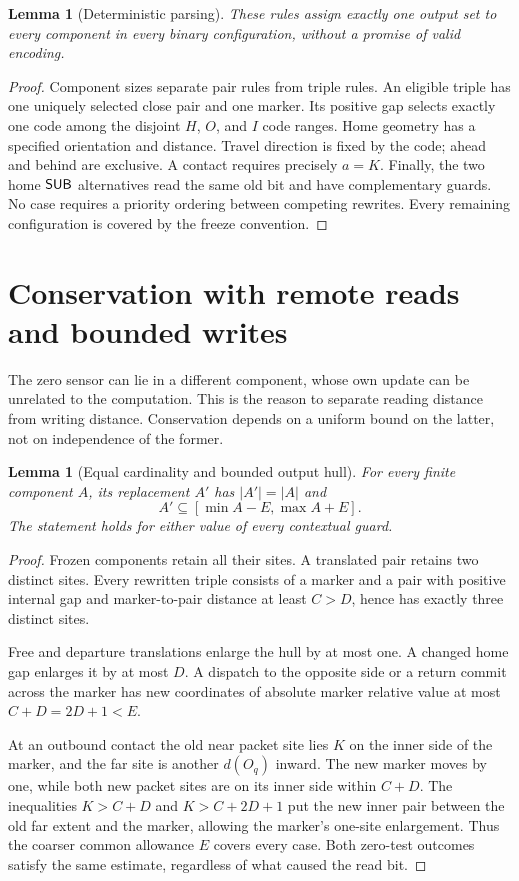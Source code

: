 \documentclass[11pt,a4paper]{article}
\numberwithin{equation}{section}
\newtheorem{lemma}[theorem]{Lemma}
\begin{document}
\begin{lemma}[Deterministic parsing]\label{fpa:bc:lem:parse}
These rules assign exactly one output set to every component in every binary
configuration, without a promise of valid encoding.
\end{lemma}
\begin{proof}
Component sizes separate pair rules from triple rules. An eligible triple has
one uniquely selected close pair and one marker. Its positive gap selects
exactly one code among the disjoint $H$, $O$, and $I$ code ranges. Home geometry
has a specified orientation and distance. Travel direction is fixed by the
code; ahead and behind are exclusive. A contact requires precisely $a=K$.
Finally, the two home $\mathsf{SUB}$ alternatives read the same old bit and have
complementary guards. No case requires a priority ordering between competing
rewrites. Every remaining configuration is covered by the freeze convention.
\end{proof}

\section{Conservation with remote reads and bounded writes}\label{fpa:bc:sec:conservation}
The zero sensor can lie in a different component, whose own update can be
unrelated to the computation. This is the reason to separate reading distance
from writing distance. Conservation depends on a uniform bound on the latter,
not on independence of the former.

\begin{lemma}[Equal cardinality and bounded output hull]\label{fpa:bc:lem:hull}
For every finite component $A$, its replacement $A'$ has $|A'|=|A|$ and
\[
 A'\subseteq[\min A-E,\max A+E].
\]
The statement holds for either value of every contextual guard.
\end{lemma}
\begin{proof}
Frozen components retain all their sites. A translated pair retains two
distinct sites. Every rewritten triple consists of a marker and a pair with
positive internal gap and marker-to-pair distance at least $C>D$, hence has exactly
three distinct sites.

Free and departure translations enlarge the hull by at most one. A changed
home gap enlarges it by at most $D$. A dispatch to the opposite side or a
return commit across the marker has new coordinates of absolute marker
relative value at most $C+D=2D+1<E$.

At an outbound contact the old near packet site lies $K$ on the inner side of
the marker, and the far site is another $d(O_q)$ inward. The new marker moves
by one, while both new packet sites are on its inner side within $C+D$.
The inequalities $K>C+D$ and $K>C+2D+1$ put the new inner pair between the old
far extent and the marker, allowing the marker's one-site enlargement.
Thus the coarser common allowance $E$ covers every case. Both zero-test
outcomes satisfy the same estimate, regardless of what caused the read bit.
\end{proof}
\end{document}
